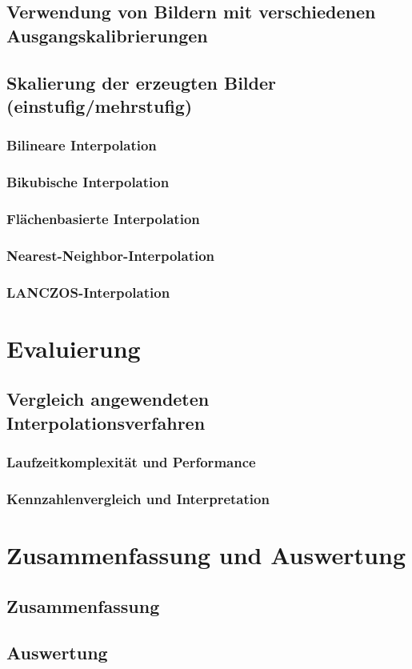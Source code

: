 \documentclass[
fontsize=10pt, 
listof = totoc,
parskip = half	
]{report}
\begin{document}
\section{Verwendung von Bildern mit verschiedenen Ausgangskalibrierungen}

\section{Skalierung der erzeugten Bilder (einstufig/mehrstufig)}

\subsection{Bilineare Interpolation}

\subsection{Bikubische Interpolation}

\subsection{Flächenbasierte Interpolation}

\subsection{Nearest-Neighbor-Interpolation}

\subsection{LANCZOS-Interpolation}



\chapter{Evaluierung}

\section{Vergleich angewendeten Interpolationsverfahren}

\subsection{Laufzeitkomplexität und Performance}

\subsection{Kennzahlenvergleich und Interpretation}




\chapter{Zusammenfassung und Auswertung}
\section{Zusammenfassung}
\section{Auswertung}
\end{document}
